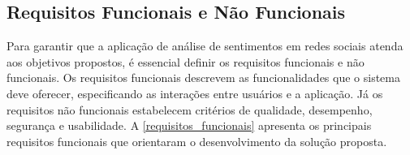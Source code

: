 \documentclass[
	12pt,				%
	oneside,			%
	a4paper,			%
	english,			%
	french,				%
	spanish,			%
	brazil				%
	]{abntex2}
\begin{document}
\hypertarget{requisitos-funcionais-e-nuxe3o-funcionais}{%
\subsection{Requisitos Funcionais e Não
Funcionais}\label{requisitos-funcionais-e-nuxe3o-funcionais}}

Para garantir que a aplicação de análise de sentimentos em redes sociais
atenda aos objetivos propostos, é essencial definir os requisitos
funcionais e não funcionais. Os requisitos funcionais descrevem as
funcionalidades que o sistema deve oferecer, especificando as interações
entre usuários e a aplicação. Já os requisitos não funcionais
estabelecem critérios de qualidade, desempenho, segurança e usabilidade.
A \autoref{requisitos_funcionais} apresenta os principais requisitos
funcionais que orientaram o desenvolvimento da solução proposta.
\end{document}
